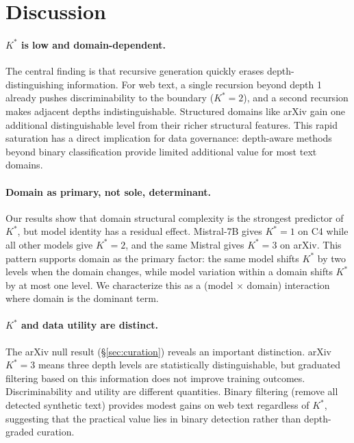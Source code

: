 \documentclass[11pt]{article}
\begin{document}
\section{Discussion}

\paragraph{$K^*$ is low and domain-dependent.} The central finding is that recursive generation quickly erases depth-distinguishing information. For web text, a single recursion beyond depth 1 already pushes discriminability to the boundary ($K^*=2$), and a second recursion makes adjacent depths indistinguishable. Structured domains like arXiv gain one additional distinguishable level from their richer structural features. This rapid saturation has a direct implication for data governance: depth-aware methods beyond binary classification provide limited additional value for most text domains.

\paragraph{Domain as primary, not sole, determinant.} Our results show that domain structural complexity is the strongest predictor of $K^*$, but model identity has a residual effect. Mistral-7B gives $K^* = 1$ on C4 while all other models give $K^* = 2$, and the same Mistral gives $K^* = 3$ on arXiv. This pattern supports domain as the primary factor: the same model shifts $K^*$ by two levels when the domain changes, while model variation within a domain shifts $K^*$ by at most one level. We characterize this as a (model $\times$ domain) interaction where domain is the dominant term.

\paragraph{$K^*$ and data utility are distinct.} The arXiv null result (\S\ref{sec:curation}) reveals an important distinction. arXiv $K^* = 3$ means three depth levels are statistically distinguishable, but graduated filtering based on this information does not improve training outcomes. Discriminability and utility are different quantities. Binary filtering (remove all detected synthetic text) provides modest gains on web text regardless of $K^*$, suggesting that the practical value lies in binary detection rather than depth-graded curation.
\end{document}
